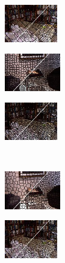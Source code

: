 \begin{figure}
\begin{subfigure}[b]{0.1375\textwidth}
    \end{subfigure}
    \begin{subfigure}[b]{0.129\textwidth}
        \includegraphics[height=1.65cm]{pictures/sunrgbd/pf/cropped/pf_00007477_contours}
    \end{subfigure}
    \begin{subfigure}[b]{0.02\textwidth}
    \end{subfigure}
    \begin{subfigure}[b]{0.1375\textwidth}
        \includegraphics[height=1.65cm]{pictures/nyuv2/tp/cropped/tp_00001297_contours}
    \end{subfigure}
    \begin{subfigure}[b]{0.129\textwidth}
        \includegraphics[height=1.65cm]{pictures/sunrgbd/tp/cropped/tp_00007477_contours}
    \end{subfigure}\\
    \begin{subfigure}[b]{0.02\textwidth}
    \end{subfigure}
    \begin{subfigure}[b]{0.1375\textwidth}
        \includegraphics[height=1.65cm]{pictures/nyuv2/cis/cropped/cis_00001297_contours}
    \end{subfigure}
    \begin{subfigure}[b]{0.129\textwidth}
        \includegraphics[height=1.65cm]{pictures/sunrgbd/cis/cropped/cis_00007477_contours}

\end{subfigure}
\end{figure}
